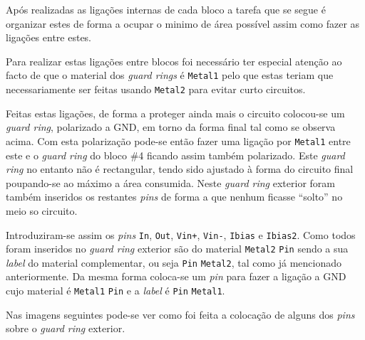 \documentclass[11pt]{article}
\numberwithin{equation}{section}
\begin{document}
Após realizadas as ligações internas de cada bloco a tarefa que se segue é organizar estes de forma a ocupar o minimo de área possível assim como fazer as ligações entre estes.

Para realizar estas ligações entre blocos foi necessário ter especial atenção ao facto de que o material dos \textit{guard rings} é \texttt{Metal1} pelo que estas teriam que necessariamente ser feitas usando \texttt{Metal2} para evitar curto circuitos. 

Feitas estas ligações, de forma a proteger ainda mais o circuito colocou-se um \textit{guard ring}, polarizado a GND, em torno da forma final tal como se observa acima. Com esta polarização pode-se então fazer uma ligação por \texttt{Metal1} entre este e o \textit{guard ring} do bloco \#4 ficando assim também polarizado. Este \textit{guard ring} no entanto não é rectangular, tendo sido ajustado à forma do circuito final poupando-se ao máximo a área consumida. Neste \textit{guard ring} exterior foram também inseridos os restantes \textit{pins} de forma a que nenhum ficasse ``solto'' no meio so circuito.

Introduziram-se assim os \textit{pins} \texttt{In}, \texttt{Out}, \texttt{Vin+}, \texttt{Vin-}, \texttt{Ibias} e \texttt{Ibias2}. Como todos foram inseridos no \textit{guard ring} exterior são do material \texttt{Metal2} \texttt{Pin} sendo a sua \textit{label} do material complementar, ou seja \texttt{Pin} \texttt{Metal2}, tal como já mencionado anteriormente. Da mesma forma coloca-se um \textit{pin} para fazer a ligação a GND cujo material é \texttt{Metal1} \texttt{Pin} e a \textit{label} é \texttt{Pin} \texttt{Metal1}.

Nas imagens seguintes pode-se ver como foi feita a colocação de alguns dos \textit{pins} sobre o \textit{guard ring} exterior.
\end{document}
